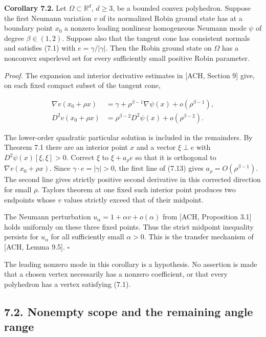 \documentclass[11pt]{article}
\begin{document}
\textbf{Corollary 7.2.} Let \(\Omega\subset\mathbb R^d\), \(d\ge3\), be
a bounded convex polyhedron. Suppose the first Neumann variation \(v\)
of its normalized Robin ground state has at a boundary point \(x_0\) a
nonzero leading nonlinear homogeneous Neumann mode \(\psi\) of degree
\(\beta\in(1,2)\). Suppose also that the tangent cone has consistent
normals and satisfies (7.1) with \(e=\gamma/|\gamma|\). Then the Robin
ground state on \(\Omega\) has a nonconvex superlevel set for every
sufficiently small positive Robin parameter.

\emph{Proof.} The expansion and interior derivative estimates in {[}ACH,
Section 9{]} give, on each fixed compact subset of the tangent cone,

\[
\begin{aligned}
\nabla v(x_0+\rho x)&=\gamma+\rho^{\beta-1}\nabla\psi(x)
+o(\rho^{\beta-1}),\\
D^2v(x_0+\rho x)&=\rho^{\beta-2}D^2\psi(x)
+o(\rho^{\beta-2}).
\end{aligned}
\tag{7.13}
\]

The lower-order quadratic particular solution is included in the
remainders. By Theorem 7.1 there are an interior point \(x\) and a
vector \(\xi\perp e\) with \(D^2\psi(x)[\xi,\xi]>0\). Correct \(\xi\) to
\(\xi+a_\rho e\) so that it is orthogonal to \(\nabla v(x_0+\rho x)\).
Since \(\gamma\cdot e=|\gamma|>0\), the first line of (7.13) gives
\(a_\rho=O(\rho^{\beta-1})\). The second line gives strictly positive
second derivative in this corrected direction for small \(\rho\).
Taylor\textquotesingle s theorem at one fixed such interior point
produces two endpoints whose \(v\) values strictly exceed that of their
midpoint.

The Neumann perturbation \(u_\alpha=1+\alpha v+o(\alpha)\) from {[}ACH,
Proposition 3.1{]} holds uniformly on these three fixed points. Thus the
strict midpoint inequality persists for \(u_\alpha\) for all
sufficiently small \(\alpha>0\). This is the transfer mechanism of
{[}ACH, Lemma 9.5{]}. \(\square\)

The leading nonzero mode in this corollary is a hypothesis. No assertion
is made that a chosen vertex necessarily has a nonzero coefficient, or
that every polyhedron has a vertex satisfying (7.1).

\subsection{7.2. Nonempty scope and the remaining angle
range}\label{nonempty-scope-and-the-remaining-angle-range}
\end{document}
